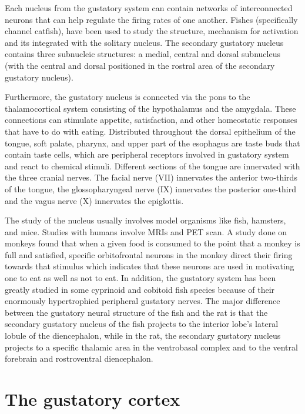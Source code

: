 Each nucleus from the gustatory system can contain networks of interconnected neurons that can help regulate the firing rates of one another. Fishes (specifically channel catfish), have been used to study the structure, mechanism for activation and its integrated with the solitary nucleus. The secondary gustatory nucleus contains three subnucleic structures: a medial, central and dorsal subnucleus (with the central and dorsal positioned in the rostral area of the secondary gustatory nucleus).

Furthermore, the gustatory nucleus is connected via the pons to the thalamocortical system consisting of the hypothalamus and the amygdala. These connections can stimulate appetite, satisfaction, and other homeostatic responses that have to do with eating. Distributed throughout the dorsal epithelium of the tongue, soft palate, pharynx, and upper part of the esophagus are taste buds that contain taste cells, which are peripheral receptors involved in gustatory system and react to chemical stimuli. Different sections of the tongue are innervated with the three cranial nerves. The facial nerve (VII) innervates the anterior two-thirds of the tongue, the glossopharyngeal nerve (IX) innervates the posterior one-third and the vagus nerve (X) innervates the epiglottis.

The study of the nucleus usually involves model organisms like fish, hamsters, and mice. Studies with humans involve MRIs and PET scan. A study done on monkeys found that when a given food is consumed to the point that a monkey is full and satisfied, specific orbitofrontal neurons in the monkey direct their firing towards that stimulus which indicates that these neurons are used in motivating one to eat as well as not to eat. In addition, the gustatory system has been greatly studied in some cyprinoid and cobitoid fish species because of their enormously hypertrophied peripheral gustatory nerves. The major difference between the gustatory neural structure of the fish and the rat is that the secondary gustatory nucleus of the fish projects to the interior lobe's lateral lobule of the diencephalon, while in the rat, the secondary gustatory nucleus projects to a specific thalamic area in the ventrobasal complex and to the ventral forebrain and rostroventral diencephalon.

\hypertarget{the-gustatory-cortex}{%
\section{The gustatory cortex}\label{the-gustatory-cortex}}

